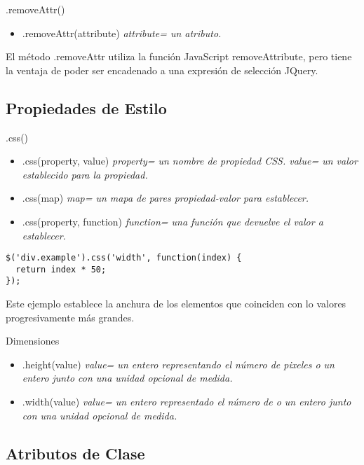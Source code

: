 \begin{frame}[fragile]{.removeAttr()} %
\begin{itemize}
    \item .removeAttr(attribute) \textit{ attribute= un atributo.}
\end{itemize}
El método .removeAttr utiliza la función JavaScript removeAttribute, pero tiene
la ventaja de poder ser encadenado a una expresión de selección JQuery.
\end{frame}

\subsection{Propiedades de Estilo} %

\begin{frame}[fragile]{.css()} %
\begin{itemize}
    \item .css(property,  value) \textit{ property= un nombre de propiedad CSS.    
    value= un valor establecido para la propiedad.}
    \item .css(map) \textit{ map= un mapa de pares propiedad-valor para
    establecer.}
    \item .css(property, function) \textit{ function= una función que devuelve el valor a establecer.}
\end{itemize}
\begin{lstlisting}
$('div.example').css('width', function(index) {
  return index * 50;
});
\end{lstlisting}
Este ejemplo establece la anchura de los elementos que coinciden con lo valores
progresivamente más grandes.
\end{frame}

\begin{frame}[fragile]{Dimensiones} %
\begin{itemize}
    \item .height(value) \textit{ value= un entero representando el número de pixeles o un entero junto con una unidad opcional de medida.}
    \item .width(value) \textit{ value= un entero representado el número de o un entero junto con una unidad opcional de medida.}
\end{itemize}
\end{frame}

\subsection{Atributos de Clase} %

